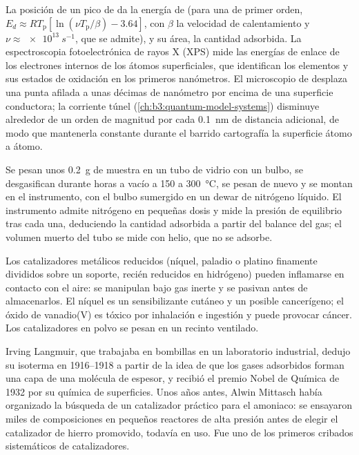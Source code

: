 La posición de un pico de  da la energía de  (para una  de primer orden,
$E_d \approx RT_{\mathrm p}[\ln(\nu T_{\mathrm p}/\beta) - 3.64]$, con $\beta$ la velocidad de calentamiento y $\nu \approx \qty{e13}{s^{-1}}$,
que se admite), y su área, la cantidad adsorbida. La espectroscopia fotoelectrónica de
rayos X (XPS) mide las energías de enlace de los electrones internos de los átomos superficiales,
que identifican los elementos y sus estados de oxidación en los primeros
nanómetros. El microscopio de  desplaza una punta afilada a unas décimas
de nanómetro por encima de una superficie conductora; la corriente túnel
(\cref{ch:b3:quantum-model-systems}) disminuye alrededor de un orden de magnitud por
cada \qty{0.1}{nm} de distancia adicional, de modo que mantenerla constante durante el barrido
cartografía la superficie átomo a átomo.

\begin{inthelab}
Se pesan unos \qty{0.2}{g} de muestra en un tubo de vidrio con un bulbo, se desgasifican
durante horas a vacío a 150 a \qty{300}{\celsius}, se pesan de nuevo y se montan en el
instrumento, con el bulbo sumergido en un dewar de nitrógeno líquido. El instrumento
admite nitrógeno en pequeñas dosis y mide la presión de equilibrio tras cada una,
deduciendo la cantidad adsorbida a partir del balance del gas; el volumen muerto del tubo
se mide con helio, que no se adsorbe.
\end{inthelab}

\begin{safety}{}
Los catalizadores metálicos reducidos (níquel, paladio o platino finamente divididos sobre un
soporte, recién reducidos en hidrógeno) pueden inflamarse en contacto con el aire: se
manipulan bajo gas inerte y se pasivan antes de almacenarlos. El níquel es un sensibilizante
cutáneo y un posible cancerígeno; el óxido de vanadio(V) es tóxico por inhalación
e ingestión y puede provocar cáncer. Los catalizadores en polvo se pesan en un recinto
ventilado.
\end{safety}

\begin{history}
Irving Langmuir, que trabajaba en bombillas en un laboratorio industrial, dedujo
su isoterma en 1916--1918 a partir de la idea de que los gases adsorbidos forman una capa de una
molécula de espesor, y recibió el premio Nobel de Química de 1932 por su química de
superficies. Unos años antes, Alwin Mittasch había organizado la búsqueda de un
catalizador práctico para el amoniaco: se ensayaron miles de composiciones en pequeños
reactores de alta presión antes de elegir el catalizador de hierro promovido, todavía en uso.
Fue uno de los primeros cribados sistemáticos de catalizadores.
\end{history}

